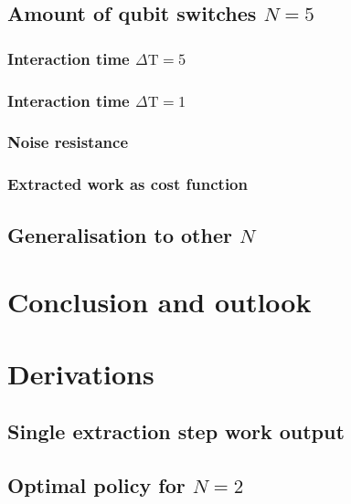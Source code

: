 \section{Amount of qubit switches $N=5$}\label{n5}
\subsection{Interaction time $\Delta \mathrm{T} = 5$}\label{n_5_ml}


\subsection{Interaction time $\Delta \mathrm{T} = 1$}\label{n_5_dt1}


\subsection{Noise resistance}\label{ml_noise}


\subsection{Extracted work as cost function}\label{work_cost}


\section{Generalisation to other $N$}
 

\chapter{Conclusion and outlook}\label{outlook}





\appendix
\chapter{Derivations}
\section{Single extraction step work output}
 \label{deriv_jump}

\section{Optimal policy for $N=2$} \label{n2_opt_pol}

